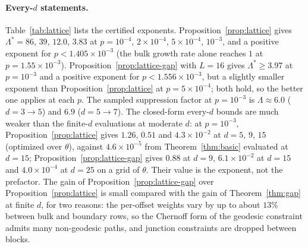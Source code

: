 \documentclass[11pt]{article}
\theoremstyle{plain}
\theoremstyle{definition}
\theoremstyle{remark}
\renewcommand{\_}{\oldunderscore\allowbreak}
\begin{document}
\paragraph{Every-$d$ statements.} Table~\ref{tab:lattice} lists the certified exponents. Proposition~\ref{prop:lattice} gives $\Lambda^\ast=86$, $39$, $12.0$, $3.83$ at $p=10^{-4}$, $2\times10^{-4}$, $5\times10^{-4}$, $10^{-3}$, and a positive exponent for $p<1.405\times10^{-3}$ (the bulk growth rate alone reaches $1$ at $p=1.55\times10^{-3}$). Proposition~\ref{prop:lattice-gap} with $L=16$ gives $\Lambda^\ast\ge3.97$ at $p=10^{-3}$ and a positive exponent for $p<1.556\times10^{-3}$, but a slightly smaller exponent than Proposition~\ref{prop:lattice} at $p=5\times10^{-4}$; both hold, so the better one applies at each $p$. The sampled suppression factor at $p=10^{-3}$ is $\Lambda\approx6.0$ ($d=3\to5$) and $6.9$ ($d=5\to7$). The closed-form every-$d$ bounds are much weaker than the finite-$d$ evaluations at moderate $d$: at $p=10^{-3}$, Proposition~\ref{prop:lattice} gives $1.26$, $0.51$ and $4.3\times10^{-2}$ at $d=5$, $9$, $15$ (optimized over $\theta$), against $4.6\times10^{-5}$ from Theorem~\ref{thm:basic} evaluated at $d=15$; Proposition~\ref{prop:lattice-gap} gives $0.88$ at $d=9$, $6.1\times10^{-2}$ at $d=15$ and $4.0\times10^{-4}$ at $d=25$ on a grid of $\theta$. Their value is the exponent, not the prefactor. The gain of Proposition~\ref{prop:lattice-gap} over Proposition~\ref{prop:lattice} is small compared with the gain of Theorem~\ref{thm:gap} at finite $d$, for two reasons: the per-offset weights vary by up to about $13\%$ between bulk and boundary rows, so the Chernoff form of the geodesic constraint admits many non-geodesic paths, and junction constraints are dropped between blocks.
\end{document}
